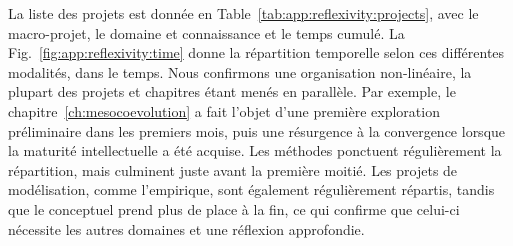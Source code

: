 La liste des projets est donnée en Table~\ref{tab:app:reflexivity:projects}, avec le macro-projet, le domaine et connaissance et le temps cumulé. La Fig.~\ref{fig:app:reflexivity:time} donne la répartition temporelle selon ces différentes modalités, dans le temps. Nous confirmons une organisation non-linéaire, la plupart des projets et chapitres étant menés en parallèle. Par exemple, le chapitre~\ref{ch:mesocoevolution} a fait l'objet d'une première exploration préliminaire dans les premiers mois, puis une résurgence à la convergence lorsque la maturité intellectuelle a été acquise. Les méthodes ponctuent régulièrement la répartition, mais culminent juste avant la première moitié. Les projets de modélisation, comme l'empirique, sont également régulièrement répartis, tandis que le conceptuel prend plus de place à la fin, ce qui confirme que celui-ci nécessite les autres domaines et une réflexion approfondie.


